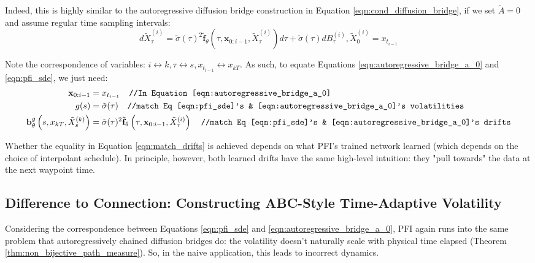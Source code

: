 \documentclass{article}
\begin{document}
Indeed, this is highly similar to the autoregressive diffusion bridge construction in Equation \ref{eqn:cond_diffusion_bridge}, if we set $\tilde{A}=0$ and assume regular time sampling intervals:
\begin{equation}\label{eqn:autoregressive_bridge_a_0}
    d\tilde{X}^{(i)}_{\tau} = \tilde{\sigma}(\tau)^2\tilde{\mathbf{f}}_\theta\left(\tau, \mathbf{x}_{0:i-1}, \tilde{X}^{(i)}_{\tau}\right)d\tau + \tilde{\sigma}(\tau)dB^{(i)}_{\tau}, \tilde{X}^{(i)}_{0}=x_{t_{i-1}}
\end{equation}

Note the correspondence of variables: $i \leftrightarrow k, \tau \leftrightarrow s, x_{t_{i-1}} \leftrightarrow x_{kT}$.
As such, to equate Equations \ref{eqn:autoregressive_bridge_a_0} and \ref{eqn:pfi_sde}, we just need:
\begin{align}
    \mathbf{x}_{0:i-1} &= x_{t_{i-1}} \texttt{ \ //In Equation \ref{eqn:autoregressive_bridge_a_0}}\\
    g(s) &= \tilde{\sigma}(\tau) \texttt{ \ //match Eq \ref{eqn:pfi_sde}'s \& \ref{eqn:autoregressive_bridge_a_0}'s volatilities}\\
    \mathbf{b}^g_\theta\left(s, x_{kT}, \tilde{X}^{(k)}_{s}\right) &= \tilde{\sigma}(\tau)^2\tilde{\mathbf{f}}_\theta\left(\tau, \mathbf{x}_{0:i-1}, \tilde{X}^{(i)}_{\tau}\right) \texttt{ \ //match Eq \ref{eqn:pfi_sde}'s \& \ref{eqn:autoregressive_bridge_a_0}'s drifts} \label{eqn:match_drifts}
\end{align}

Whether the equality in Equation \ref{eqn:match_drifts} is achieved depends on what PFI's trained network learned (which depends on the choice of interpolant schedule). In principle, however, both learned drifts have the same high-level intuition: they "pull towards" the data at the next waypoint time.

\subsection{Difference to Connection: Constructing ABC-Style Time-Adaptive Volatility}

Considering the correspondence between Equations \ref{eqn:pfi_sde} and \ref{eqn:autoregressive_bridge_a_0}, PFI again runs into the same problem that autoregressively chained diffusion bridges do: the volatility doesn't naturally scale with physical time elapsed (Theorem \ref{thm:non_bijective_path_measure}). So, in the naive application, this leads to incorrect dynamics.
\end{document}
